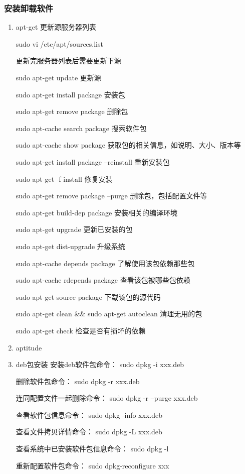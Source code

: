 \documentclass[11pt]{article}
\begin{document}
\subsubsection{安装卸载软件}
\label{sec-1-1-5}
\begin{enumerate}
\item apt-get
\label{sec-1-1-5-1}
更新源服务器列表

sudo vi /etc/apt/sources.list

更新完服务器列表后需要更新下源

sudo apt-get update  更新源

sudo apt-get install package 安装包

sudo apt-get remove package 删除包

sudo apt-cache search package 搜索软件包

sudo apt-cache show package  获取包的相关信息，如说明、大小、版本等

sudo apt-get install package --reinstall   重新安装包

sudo apt-get -f install   修复安装

sudo apt-get remove package --purge 删除包，包括配置文件等

sudo apt-get build-dep package 安装相关的编译环境

sudo apt-get upgrade 更新已安装的包

sudo apt-get dist-upgrade 升级系统

sudo apt-cache depends package 了解使用该包依赖那些包

sudo apt-cache rdepends package 查看该包被哪些包依赖

sudo apt-get source package  下载该包的源代码

sudo apt-get clean \&\& sudo apt-get autoclean 清理无用的包

sudo apt-get check 检查是否有损坏的依赖
\item aptitude
\label{sec-1-1-5-2}
\item deb包安装
\label{sec-1-1-5-3}
安装deb软件包命令： sudo dpkg -i xxx.deb

删除软件包命令：  sudo dpkg -r xxx.deb

连同配置文件一起删除命令： sudo dpkg -r --purge xxx.deb

查看软件包信息命令： sudo dpkg -info xxx.deb

查看文件拷贝详情命令： sudo dpkg -L xxx.deb

查看系统中已安装软件包信息命令： sudo dpkg -l

重新配置软件包命令：  sudo dpkg-reconfigure xxx


\end{enumerate}
\end{document}
